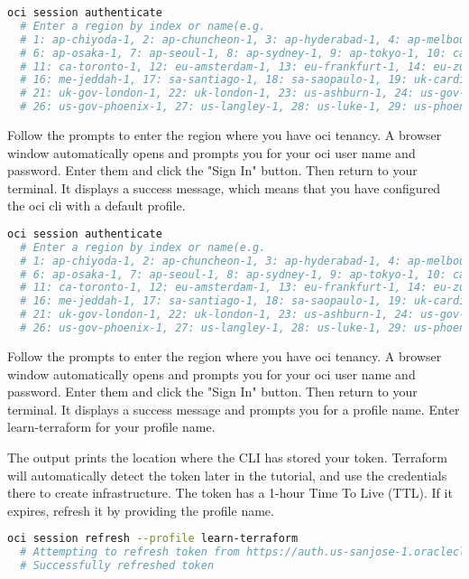 \documentclass[../main.tex]{subfiles}
\begin{document}
\begin{lstlisting}[language=bash, caption={Configure the OCI CLI from your terminal}, label={lst:configure-the-oci-cli-from-your-terminal}]
  oci session authenticate
  # Enter a region by index or name(e.g.
  # 1: ap-chiyoda-1, 2: ap-chuncheon-1, 3: ap-hyderabad-1, 4: ap-melbourne-1, 5: ap-mumbai-1,
  # 6: ap-osaka-1, 7: ap-seoul-1, 8: ap-sydney-1, 9: ap-tokyo-1, 10: ca-montreal-1,
  # 11: ca-toronto-1, 12: eu-amsterdam-1, 13: eu-frankfurt-1, 14: eu-zurich-1, 15: me-dubai-1,
  # 16: me-jeddah-1, 17: sa-santiago-1, 18: sa-saopaulo-1, 19: uk-cardiff-1, 20: uk-gov-cardiff-1,
  # 21: uk-gov-london-1, 22: uk-london-1, 23: us-ashburn-1, 24: us-gov-ashburn-1, 25: us-gov-chicago-1,
  # 26: us-gov-phoenix-1, 27: us-langley-1, 28: us-luke-1, 29: us-phoenix-1, 30: us-sanjose-1):
\end{lstlisting}

Follow the prompts to enter the region where you have \acrshort{oci} tenancy. A browser window automatically opens and prompts you for your \acrshort{oci} user name and password. Enter them and click the "Sign In" button. Then return to your terminal. It displays a success message, which means that you have configured the \acrshort{oci} \acrshort{cli} with a default profile.

\begin{lstlisting}[language=bash]
  oci session authenticate
  # Enter a region by index or name(e.g.
  # 1: ap-chiyoda-1, 2: ap-chuncheon-1, 3: ap-hyderabad-1, 4: ap-melbourne-1, 5: ap-mumbai-1,
  # 6: ap-osaka-1, 7: ap-seoul-1, 8: ap-sydney-1, 9: ap-tokyo-1, 10: ca-montreal-1,
  # 11: ca-toronto-1, 12: eu-amsterdam-1, 13: eu-frankfurt-1, 14: eu-zurich-1, 15: me-dubai-1,
  # 16: me-jeddah-1, 17: sa-santiago-1, 18: sa-saopaulo-1, 19: uk-cardiff-1, 20: uk-gov-cardiff-1,
  # 21: uk-gov-london-1, 22: uk-london-1, 23: us-ashburn-1, 24: us-gov-ashburn-1, 25: us-gov-chicago-1,
  # 26: us-gov-phoenix-1, 27: us-langley-1, 28: us-luke-1, 29: us-phoenix-1, 30: us-sanjose-1):
\end{lstlisting}

Follow the prompts to enter the region where you have \acrshort{oci} tenancy. A browser window automatically opens and prompts you for your \acrshort{oci} user name and password. Enter them and click the "Sign In" button. Then return to your terminal. It displays a success message and prompts you for a profile name.
Enter learn-terraform for your profile name.

The output prints the location where the CLI has stored your token. Terraform will automatically detect the token later in the tutorial, and use the credentials there to create infrastructure. The token has a 1-hour Time To Live (TTL). If it expires, refresh it by providing the profile name.
\begin{lstlisting}[language=bash]
  oci session refresh --profile learn-terraform
  # Attempting to refresh token from https://auth.us-sanjose-1.oraclecloud.com/v1/authentication/refresh
  # Successfully refreshed token
\end{lstlisting}
\end{document}
